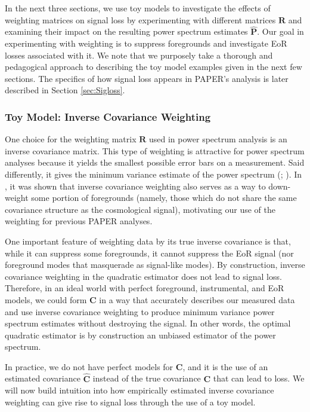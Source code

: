 \documentclass[preprint2,numberedappendix,tighten]{aastex6}
\begin{document}
In the next three sections, we use toy models to investigate the effects of weighting matrices on signal loss by experimenting with different matrices $\textbf{R}$ and examining their impact on the resulting power spectrum estimates $\widehat{\textbf{P}}$. Our goal in 
experimenting with weighting is to suppress foregrounds and investigate EoR losses associated with it. We note that we 
purposely take a thorough and pedagogical approach to describing the toy model examples given in the next few sections. The specifics of how signal loss appears in PAPER's analysis is later described in Section 
\ref{sec:Sigloss}.

\subsubsection{Toy Model: Inverse Covariance Weighting}
\label{sec:toymodel}

One choice for the weighting matrix $\textbf{R}$ used in power spectrum analysis is an inverse covariance matrix. This type of weighting is attractive for power spectrum analyses because it yields the smallest possible error bars on a measurement. Said differently, it gives the minimum variance estimate of the power spectrum (\citealt{tegmark_et_al1997a}; \citealt{bond_et_al1998}). In \citet{liu_tegmark2011}, it was shown that inverse covariance weighting also serves as a way to down-weight some portion of foregrounds (namely, those which do not share the same covariance structure as the cosmological signal), motivating our use of the weighting for previous PAPER analyses.

One important feature of weighting data by its true inverse covariance is that, while it can suppress some foregrounds, it cannot suppress the EoR signal (nor foreground modes that masquerade as signal-like modes). By construction, inverse covariance weighting in the quadratic estimator does not lead to signal loss. Therefore, in an ideal world with perfect foreground, 
instrumental, and EoR models, we could form $\textbf{C}$ in a way that accurately describes our measured data and use inverse covariance weighting to produce minimum variance power spectrum estimates without destroying the signal. In other words, the optimal quadratic estimator is by construction an unbiased estimator of the power spectrum.

In practice, we do not have perfect models for $\textbf{C}$, and it is the use of an estimated covariance $\widehat{\textbf{C}}$ instead of the true covariance $\textbf{C}$ that can lead to loss. We will now build intuition into how empirically estimated inverse covariance weighting can give rise to signal loss through the use of a toy model.
\end{document}
